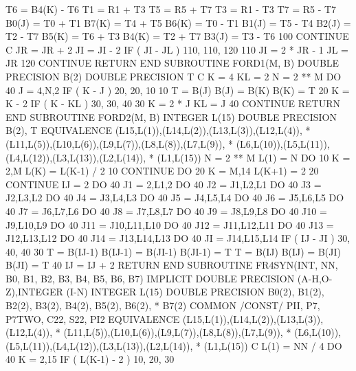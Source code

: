               T6 = B4(K) - T6
              T1 = R1 + T3
              T5 = R5 + T7
              T3 = R1 - T3
              T7 = R5 - T7
              B0(J) = T0 + T1
              B7(K) = T4 + T5
              B6(K) = T0 - T1
              B1(J) = T5 - T4
              B2(J) = T2 - T7
              B5(K) = T6 + T3
              B4(K) = T2 + T7
              B3(J) = T3 - T6
100       CONTINUE
C
          JR = JR + 2
          JI = JI - 2
          IF ( JI - JL ) 110, 110, 120
110       JI = 2 * JR - 1
          JL = JR
120   CONTINUE
      RETURN
      END
      SUBROUTINE FORD1(M, B)
      DOUBLE PRECISION B(2)
      DOUBLE PRECISION T
C
      K = 4
      KL = 2
      N = 2 ** M
      DO 40 J = 4,N,2
          IF ( K - J ) 20, 20, 10
10        T = B(J)
          B(J) = B(K)
          B(K) = T
20        K = K - 2
          IF ( K - KL ) 30, 30, 40
30        K = 2 * J
          KL = J
40    CONTINUE
      RETURN
      END
      SUBROUTINE FORD2(M, B)
      INTEGER L(15)
      DOUBLE PRECISION  B(2), T
      EQUIVALENCE (L15,L(1)),(L14,L(2)),(L13,L(3)),(L12,L(4)),
     *  (L11,L(5)),(L10,L(6)),(L9,L(7)),(L8,L(8)),(L7,L(9)),
     *  (L6,L(10)),(L5,L(11)),(L4,L(12)),(L3,L(13)),(L2,L(14)),
     *  (L1,L(15))
      N = 2 ** M
      L(1) = N
      DO 10 K = 2,M
          L(K) = L(K-1) / 2
10    CONTINUE
      DO 20 K = M,14
          L(K+1) = 2
20    CONTINUE
      IJ = 2
      DO  40 J1 = 2,L1,2
      DO  40 J2 = J1,L2,L1
      DO  40 J3 = J2,L3,L2
      DO  40 J4 = J3,L4,L3
      DO  40 J5 = J4,L5,L4
      DO  40 J6 = J5,L6,L5
      DO  40 J7 = J6,L7,L6
      DO  40 J8 = J7,L8,L7
      DO  40 J9 = J8,L9,L8
      DO  40 J10 = J9,L10,L9
      DO  40 J11 = J10,L11,L10
      DO  40 J12 = J11,L12,L11
      DO  40 J13 = J12,L13,L12
      DO  40 J14 = J13,L14,L13
      DO  40 JI = J14,L15,L14
           IF ( IJ - JI ) 30, 40, 40
30         T = B(IJ-1)
           B(IJ-1) = B(JI-1)
           B(JI-1) = T
           T = B(IJ)
           B(IJ) = B(JI)
           B(JI) = T
40         IJ = IJ + 2
       RETURN
       END
      SUBROUTINE FR4SYN(INT, NN, B0, B1, B2, B3, B4, B5, B6, B7)
      IMPLICIT DOUBLE PRECISION (A-H,O-Z),INTEGER (I-N)
      INTEGER L(15)
      DOUBLE PRECISION B0(2), B1(2), B2(2), B3(2), B4(2), B5(2), B6(2),
     *    B7(2)
      COMMON /CONST/ PII, P7, P7TWO, C22, S22, PI2
      EQUIVALENCE (L15,L(1)),(L14,L(2)),(L13,L(3)),(L12,L(4)),
     *  (L11,L(5)),(L10,L(6)),(L9,L(7)),(L8,L(8)),(L7,L(9)),
     *  (L6,L(10)),(L5,L(11)),(L4,L(12)),(L3,L(13)),(L2,L(14)),
     *  (L1,L(15))
C
      L(1) = NN / 4
      DO 40 K = 2,15
          IF ( L(K-1) - 2 ) 10, 20, 30
